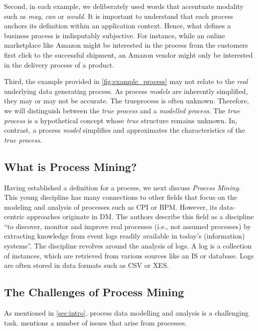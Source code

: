 \documentclass[./../../paper.tex]{subfiles}
\begin{document}
Second, in each example, we deliberately used words that accentuate modality such as \emph{may}, \emph{can} or \emph{would}. It is important to understand that each process anchors its definition within an application context. Hence, what defines a business process is indisputably subjective. For instance, while an online marketplace like Amazon might be interested in the process from the customers first click to the successful shipment, an Amazon vendor might only be interested in the delivery process of a product.

Third, the example provided in \autoref{fig:example_process} may not relate to the \emph{real} underlying data generating process. As process \emph{models} are inherently simplified, they may or may not be accurate. The \gls{trueprocess} is often unknown. Therefore, we will distinguish between the \emph{true process} and a \emph{modelled process}. The \emph{true process} is a hypothetical concept whose \emph{true} structure remains unknown. In, contrast, a process \emph{model} simplifies and approximates the characteristics of the \emph{true process}.

\subsection{What is Process Mining?}
Having established a definition for a process, we next discuss \emph{Process Mining}. This young discipline has many connections to other fields that focus on the modeling and analysis of processes such as \gls{CPI} or \gls{BPM}\autocite{vanderaalst_ProcessMiningManifesto_2012}. However, its data-centric approaches originate in \gls{DM}.
The authors \citeauthor{vanderaalst_ProcessMiningManifesto_2012} describe this field as a discipline \enquote{to discover, monitor and improve real processes (i.e., not assumed processes) by extracting knowledge from event logs readily available in today's (information) systems}\autocite{vanderaalst_ProcessMiningManifesto_2012}. The discipline revolves around the analysis of \glspl{log}.
A \gls{log} is a collection of \glspl{instance}, which are retrieved from various sources like an \gls{IS} or database. Logs are often stored in data formats such as \gls{CSV} or \gls{XES}\needscite{}.

\subsection{The Challenges of Process Mining}
As mentioned in \autoref{sec:intro}, process data modelling and analysis is a challenging task. \citeauthor{vanderaalst_ProcessMiningManifesto_2012} mentions a number of issues that arise from processes\autocite{vanderaalst_ProcessMiningManifesto_2012}.
\end{document}
